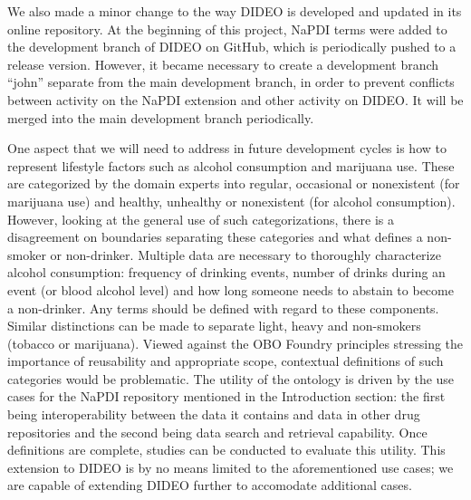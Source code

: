 \documentclass{bmcart}
\begin{document}
We also made a minor change to the way DIDEO is developed and updated in its online repository. At the beginning of this project, NaPDI terms were added to the development branch of DIDEO on GitHub, which is periodically pushed to a release version. However, it became necessary to create a development branch ``john” separate from the main development branch, in order to prevent conflicts between activity on the NaPDI extension and other activity on DIDEO. It will be merged into the main development branch periodically.

One aspect that we will need to address in future development cycles is how to represent lifestyle factors such as alcohol consumption and marijuana use.
These are categorized by the domain experts into regular, occasional or nonexistent (for marijuana use) and healthy, unhealthy or nonexistent (for alcohol consumption).
However, looking at the general use of such categorizations, there is a disagreement on boundaries separating these categories and what defines a non-smoker or non-drinker.
Multiple data are necessary to thoroughly characterize alcohol consumption: frequency of drinking events, number of drinks during an event (or blood alcohol level) and how long someone needs to abstain to become a non-drinker.
Any terms should be defined with regard to these components.
Similar distinctions can be made to separate light, heavy and non-smokers (tobacco or marijuana).
Viewed against the OBO Foundry principles stressing the importance of reusability and appropriate scope, contextual definitions of such categories would be problematic.
The utility of the ontology is driven by the use cases for the NaPDI repository mentioned in the Introduction section:  the first being interoperability between the data it contains and data in other drug repositories and the second being data search and retrieval capability.
Once definitions are complete, studies can be conducted to evaluate this utility.
This extension to DIDEO is by no means limited to the aforementioned use cases; we are capable of extending DIDEO further to accomodate additional cases.
\end{document}
